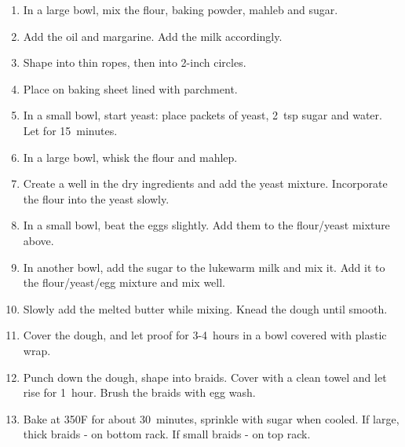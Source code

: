 \begin{enumerate}
    \item In a large bowl, mix the flour, baking powder, mahleb and sugar.
    \item Add the oil and margarine. Add the milk accordingly.
    \item Shape into thin ropes, then into 2-inch circles.
    \item Place on baking sheet lined with parchment.
    \item In a small bowl, start yeast: place packets of yeast, 2~tsp sugar and water. Let for 15~minutes.
    \item In a large bowl, whisk the flour and mahlep.
    \item Create a well in the dry ingredients and add the yeast mixture. Incorporate the flour into the yeast slowly.
    \item In a small bowl, beat the eggs slightly. Add them to the flour/yeast mixture above.
    \item In another bowl, add the sugar to the lukewarm milk and mix it. Add it to the flour/yeast/egg mixture and mix well.
    \item Slowly add the melted butter while mixing. Knead the dough until smooth.
    \item Cover the dough, and let proof for 3-4~hours in a bowl covered with plastic wrap.
    \item Punch down the dough, shape into braids. Cover with a clean towel and let rise for 1~hour. Brush the braids with egg wash.
    \item Bake at 350\degree F for about 30~minutes, sprinkle with sugar when cooled.
    If large, thick braids - on bottom rack.
    If small braids - on top rack.
\end{enumerate}
